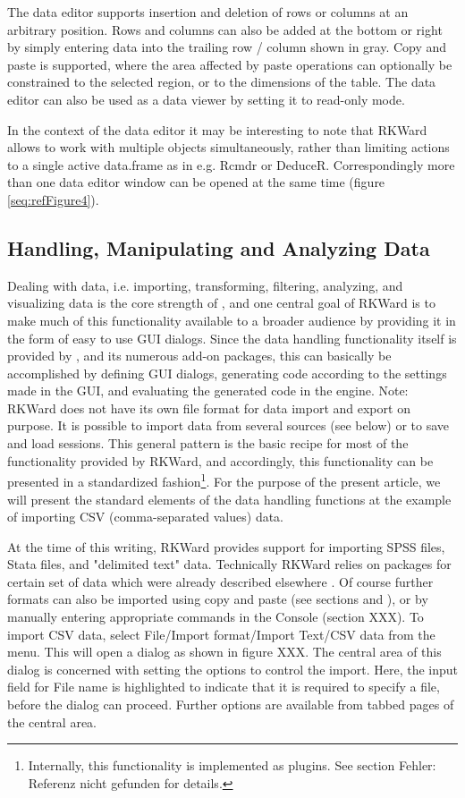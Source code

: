 The data editor supports insertion and deletion of rows or columns at an
arbitrary position. Rows and columns can also be added at the bottom or
right by simply entering data into the trailing row / column shown in
gray. Copy and paste is supported, where the area affected by paste
operations can optionally be constrained to the selected region, or to
the dimensions of the table. The data editor can also be used as a data
viewer by setting it to read-only mode.

In the context of the data editor it may be interesting to note that
RKWard allows to work with multiple objects simultaneously, rather than
limiting actions to a single active data.frame as in e.g. Rcmdr or
DeduceR. Correspondingly more than one data editor window can be opened
at the same time (figure \ref{seq:refFigure4}).

\subsection{Handling, Manipulating and Analyzing Data}
\label{sec:analyzing_data}

Dealing with data, i.e. importing, transforming, filtering, analyzing, and visualizing data is the core
strength of , and one central goal of
RKWard is to make much of this functionality available to a broader
audience by providing it in the form of easy to use GUI dialogs. Since
the data handling functionality itself is provided by
, and its numerous add-on packages, this
can basically be accomplished by defining GUI dialogs, generating
 code according to the settings made in
the GUI, and evaluating the generated code in the
 engine. Note: RKWard does not have its
own file format for data import and export on purpose. It is possible
to import data from several sources (see below) or to save and load
 sessions. This general pattern is the
basic recipe for most of the functionality provided by RKWard, and
accordingly, this functionality can be presented in a standardized
fashion\footnote{Internally, this functionality is implemented as
plugins. See section Fehler: Referenz nicht gefunden for details.}. For
the purpose of the present article, we will present the standard
elements of the data handling functions at the example of importing CSV
(comma-separated values) data.

At the time of this writing, RKWard provides support for importing SPSS
files, Stata files, and "delimited text" data. Technically RKWard
relies on  packages for certain set of
data which were already described elsewhere
\citep{Murdoch2002}. Of course further formats can
also be imported using copy and paste (see sections  and ), or by
manually entering appropriate  commands in
the  Console (section XXX). To import CSV
data, select File/Import format/Import Text/CSV
data from the menu. This will open a dialog as shown in
figure XXX. The central area of this dialog is concerned with setting
the options to control the import. Here, the input field for
File name is highlighted to indicate that
it is required to specify a file, before the dialog can proceed.
Further options are available from tabbed pages of the central area.

